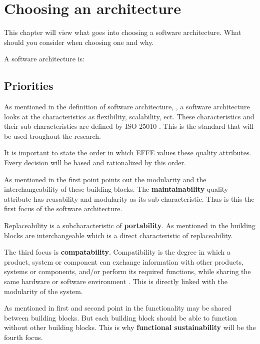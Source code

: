 \chapter{Choosing an architecture}
\label{sec:ChoosingArchitecture}

This chapter will view what goes into choosing a software architecture. What should you consider when choosing one and why.

A software architecture is:


\section{Priorities}
\label{sec:Priorities}

As mentioned in the definition of software architecture, , a software architecture looks at the characteristics as flexibility, scalability, ect. These characteristics and their sub characteristics are defined by ISO 25010 \cite{iso25010}. This is the standard that will be used troughout the research.

It is important to state the order in which EFFE values these quality attributes. Every decision will be based and rationalized by this order.

As mentioned in  the first point points out the modularity and the interchangeability of these building blocks. The \textbf{maintainability} quality attribute has reusability and modularity as its sub characteristic. Thus is this the first focus of the software architecture.

Replaceability is a subcharacteristic of \textbf{portability}. As mentioned in  the building blocks are interchangeable which is a direct characteristic of replaceability.

The third focus is \textbf{compatability}. Compatibility is the degree in which a product, system or component can exchange information with other products, systems or components, and/or perform its required functions, while sharing the same hardware or software environment \cite{iso25010}. This is directly linked with the modularity of the system.

As mentioned in first and second point in  the functionality may be shared between building blocks. But each building block should be able to function without other building blocks. This is why \textbf{functional sustainability} will be the fourth focus.

